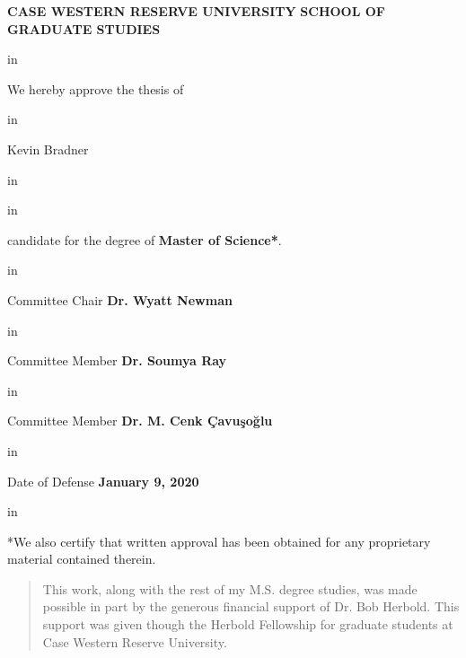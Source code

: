 \begin{center}
\begin{Large}
\textbf{CASE WESTERN RESERVE UNIVERSITY}
\linebreak
\textbf{SCHOOL OF GRADUATE STUDIES}
\end{Large}

 in

We hereby approve the thesis of

 in

\begin{Large}
Kevin Bradner
\end{Large}

 in

 in

candidate for the degree of \textbf{Master of Science*}.

 in

Committee Chair
\linebreak
\textbf{Dr. Wyatt Newman}

 in

Committee Member
\linebreak
\textbf{Dr. Soumya Ray}

 in

Committee Member
\linebreak
\textbf{Dr. M. Cenk {\c C}avu{\c s}o{\u g}lu}

 in

Date of Defense
\linebreak
\textbf{January 9, 2020}

 in

*We also certify that written approval has been obtained
\linebreak
for any proprietary material contained therein.

\end{center}

\renewcommand{\abstractname}{Acknowledgements}
\begin{abstract}
This work, along with the rest of my M.S. degree studies, was made possible in part by the generous financial support of Dr. Bob Herbold. This support was given though the Herbold Fellowship for graduate students at Case Western Reserve University.
\end{abstract}

\tableofcontents

\listoftables

\listoffigures

